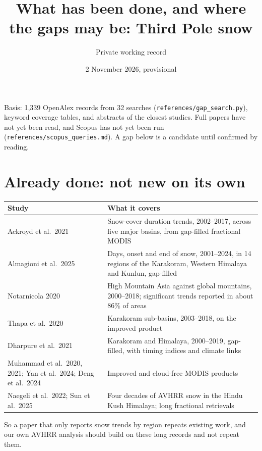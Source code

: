\documentclass[11pt,a4paper]{article}
\title{What has been done, and where the gaps may be: Third Pole snow}
\author{Private working record}
\date{2 November 2026, provisional}
\begin{document}
\maketitle
\noindent Basis: 1,339 OpenAlex records from 32 searches (\texttt{references/gap\_search.py}), keyword coverage tables, and abstracts of the closest studies. Full papers have not yet been read, and Scopus has not yet been run (\texttt{references/scopus\_queries.md}). A gap below is a candidate until confirmed by reading.

\section{Already done: not new on its own}
\begin{tabularx}{\textwidth}{@{}lX@{}}
\toprule
Study & What it covers \\
\midrule
Ackroyd et al.\ 2021 & Snow-cover duration trends, 2002--2017, across five major basins, from gap-filled fractional MODIS \\
Almagioni et al.\ 2025 & Days, onset and end of snow, 2001--2024, in 14 regions of the Karakoram, Western Himalaya and Kunlun, gap-filled \\
Notarnicola 2020 & High Mountain Asia against global mountains, 2000--2018; significant trends reported in about 86\% of areas \\
Thapa et al.\ 2020 & Karakoram sub-basins, 2003--2018, on the improved product \\
Dharpure et al.\ 2021 & Karakoram and Himalaya, 2000--2019, gap-filled, with timing indices and climate links \\
Muhammad et al.\ 2020, 2021; Yan et al.\ 2024; Deng et al.\ 2024 & Improved and cloud-free MODIS products \\
Naegeli et al.\ 2022; Sun et al.\ 2025 & Four decades of AVHRR snow in the Hindu Kush Himalaya; long fractional retrievals \\
\bottomrule
\end{tabularx}

\medskip\noindent So a paper that only reports snow trends by region repeats existing work, and our own AVHRR analysis should build on these long records and not repeat them.
\end{document}
